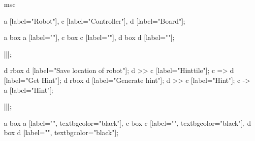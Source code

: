 \begin{msc}
msc
{

a [label="Robot"],
c [label="Controller"],
d [label="Board"];

a box a [label=""],
c box c [label=""],
d box d [label=""];

|||;

d rbox d [label="Save location of robot"];
d >> c [label="Hinttile"];
c => d [label="Get Hint"];
d rbox d [label="Generate hint"];
d >> c [label="Hint"];
c -> a [label="Hint"];

|||;

a box a [label="", textbgcolor="black"],
c box c [label="", textbgcolor="black"],
d box d [label="", textbgcolor="black"];

}
\end{msc}
